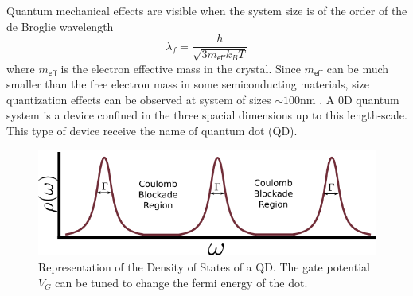 Quantum mechanical effects are visible when the system size is of the order of the de Broglie wavelength \citep[(1.1)]{bimberg_quantum_1999}
\[
\lambda_{f}=\frac{h}{\sqrt{3m_{\mathsf{eff}}k_{B}T}}
\]
 where $m_{\mathsf{eff}}$ is the electron effective mass in the crystal. Since $m_{\mathsf{eff}}$ can be much smaller than the free electron mass in some semiconducting materials, size quantization effects can be observed at system of sizes $\sim100\mbox{nm}$ \cite{sindel_numerical_2005}. A $0$D quantum system is a device confined in the three spacial dimensions up to this length-scale. This type of device receive the name of quantum dot (QD). 

\begin{figure}[tb]
    \centering
    \includegraphics[scale=0.5]{IMAGES/Preliminars/specDot.png}
    \caption{Representation of the Density of States of a QD. The gate potential $V_G$ can be tuned to change the fermi energy of the dot. 
    \label{fig:specDots}}
\end{figure}


